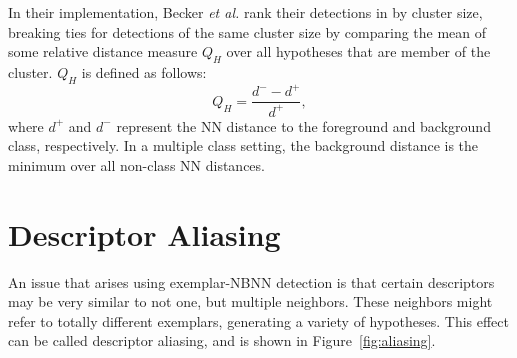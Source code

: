 In their implementation, Becker \emph{et al.} \cite{becker2012codebook} rank their detections in by cluster size, breaking ties for detections of the same cluster size by comparing the mean of some relative distance measure $Q_H$ over all hypotheses that are member of the cluster. $Q_H$ is defined as follows: \begin{equation}
    Q_H=\frac{d^- - d^+}{d^+},
    \label{eq:qh}
\end{equation}
where $d^+$ and $d^-$ represent the NN distance to the foreground and background class, respectively. In a multiple class setting, the background distance is the minimum over all non-class NN distances.

\section{Descriptor Aliasing} %
\label{sec:descriptor_aliasing}

An issue that arises using exemplar-NBNN detection is that certain descriptors may be very similar to not one, but multiple neighbors. These neighbors might refer to totally different exemplars, generating a variety of hypotheses. This effect can be called descriptor aliasing, and is shown in Figure~\ref{fig:aliasing}.


